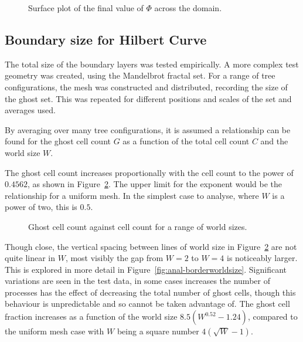 \documentclass[twoside]{IIBproject}
\numberwithin{figure}{section}
\begin{document}
        \begin{figure}[H]
            \centering
            
            \caption{Surface plot of the final value of $\Phi$ across the domain.}
            \label{fig:pois-result}
        \end{figure}



    \subsection{Boundary size for Hilbert Curve}
        \label{sec:results-boundarysize}

        The total size of the boundary layers was tested empirically. A more complex test geometry was created, using the Mandelbrot fractal set. For a range of tree configurations, the mesh was constructed and distributed, recording the size of the ghost set. This was repeated for different positions and scales of the set and averages used.

        By averaging over many tree configurations, it is assumed a relationship can be found for the ghost cell count $G$ as a function of the total cell count $C$ and the world size $W$.

        The ghost cell count increases proportionally with the cell count to the power of $0.4562$, as shown in Figure~\ref{fig:anal-scaling}. The upper limit for the exponent would be the relationship for a uniform mesh. In the simplest case to analyse, where $W$ is a power of two, this is $0.5$. 

        \tikzset{external/export next=false}
        \begin{figure}[H]
            \centering
            
            \caption{Ghost cell count against cell count for a range of world sizes. }
            \label{fig:anal-scaling}
        \end{figure}

        Though close, the vertical spacing between lines of world size in Figure~\ref{fig:anal-scaling} are not quite linear in $W$, most visibly the gap from $W=2$ to $W=4$ is noticeably larger. This is explored in more detail in Figure~\ref{fig:anal-borderworldsize}. Significant variations are seen in the test data, in some cases increases the number of processes has the effect of decreasing the total number of ghost cells, though this behaviour is unpredictable and so cannot be taken advantage of. The ghost cell fraction increases as a function of the world size $8.5(W^{0.52}-1.24)$, compared to the uniform mesh case with $W$ being a square number $4(\sqrt{W} - 1)$. 
\end{document}
